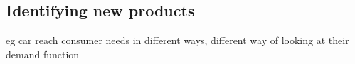 
\subsection{Identifying new products}

eg car
reach consumer needs in different ways, different way of looking at their demand function

